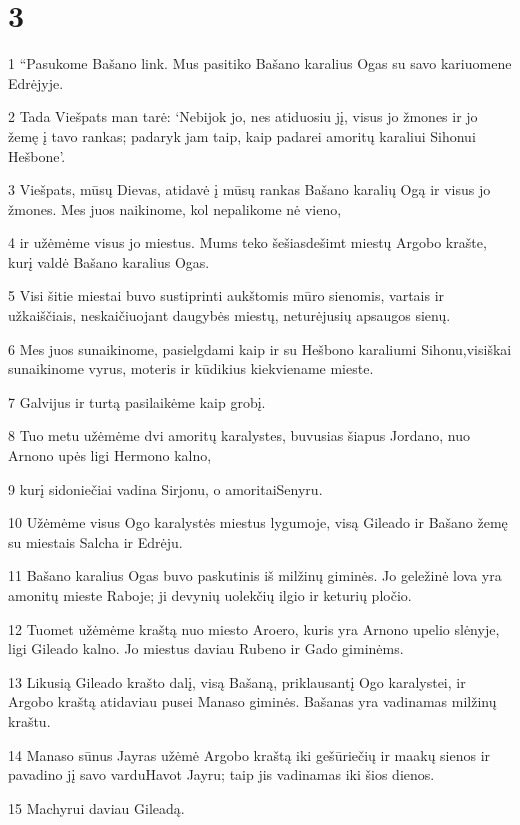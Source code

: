 \chapter{3}


\par 1 “Pasukome Bašano link. Mus pasitiko Bašano karalius Ogas su savo kariuomene Edrėjyje. 
\par 2 Tada Viešpats man tarė: ‘Nebijok jo, nes atiduosiu jį, visus jo žmones ir jo žemę į tavo rankas; padaryk jam taip, kaip padarei amoritų karaliui Sihonui Hešbone’. 
\par 3 Viešpats, mūsų Dievas, atidavė į mūsų rankas Bašano karalių Ogą ir visus jo žmones. Mes juos naikinome, kol nepalikome nė vieno, 
\par 4 ir užėmėme visus jo miestus. Mums teko šešiasdešimt miestų Argobo krašte, kurį valdė Bašano karalius Ogas. 
\par 5 Visi šitie miestai buvo sustiprinti aukštomis mūro sienomis, vartais ir užkaiščiais, neskaičiuojant daugybės miestų, neturėjusių apsaugos sienų. 
\par 6 Mes juos sunaikinome, pasielgdami kaip ir su Hešbono karaliumi Sihonu,­visiškai sunaikinome vyrus, moteris ir kūdikius kiekviename mieste. 
\par 7 Galvijus ir turtą pasilaikėme kaip grobį. 
\par 8 Tuo metu užėmėme dvi amoritų karalystes, buvusias šiapus Jordano, nuo Arnono upės ligi Hermono kalno, 
\par 9 kurį sidoniečiai vadina Sirjonu, o amoritai­Senyru. 
\par 10 Užėmėme visus Ogo karalystės miestus lygumoje, visą Gileado ir Bašano žemę su miestais Salcha ir Edrėju. 
\par 11 Bašano karalius Ogas buvo paskutinis iš milžinų giminės. Jo geležinė lova yra amonitų mieste Raboje; ji devynių uolekčių ilgio ir keturių pločio. 
\par 12 Tuomet užėmėme kraštą nuo miesto Aroero, kuris yra Arnono upelio slėnyje, ligi Gileado kalno. Jo miestus daviau Rubeno ir Gado giminėms. 
\par 13 Likusią Gileado krašto dalį, visą Bašaną, priklausantį Ogo karalystei, ir Argobo kraštą atidaviau pusei Manaso giminės. Bašanas yra vadinamas milžinų kraštu. 
\par 14 Manaso sūnus Jayras užėmė Argobo kraštą iki gešūriečių ir maakų sienos ir pavadino jį savo vardu­Havot Jayru; taip jis vadinamas iki šios dienos. 
\par 15 Machyrui daviau Gileadą. 
